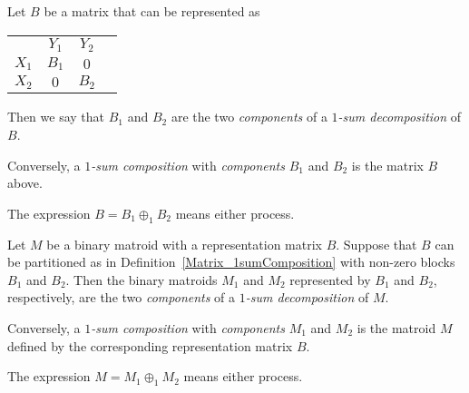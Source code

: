 \begin{definition}
  \label{Matrix_1sumComposition}
  \leanok
  Let $B$ be a matrix that can be represented as
  \begin{tabular}{cccc}
                                 & $Y_{1}$                      & $Y_{2}$                      \\ \cline{2-3}
    \multicolumn{1}{c|}{$X_{1}$} & \multicolumn{1}{c|}{$B_{1}$} & \multicolumn{1}{c|}{    $0$} \\ \cline{2-3}
    \multicolumn{1}{c|}{$X_{2}$} & \multicolumn{1}{c|}{    $0$} & \multicolumn{1}{c|}{$B_{2}$} \\ \cline{2-3}
  \end{tabular}
  Then we say that $B_{1}$ and $B_{2}$ are the two \emph{components} of a \emph{$1$-sum decomposition} of $B$.

  Conversely, a \emph{$1$-sum composition} with \emph{components} $B_{1}$ and $B_{2}$ is the matrix $B$ above.

  The expression $B = B_{1} \oplus_{1} B_{2}$ means either process.
\end{definition}

\begin{definition}
  \label{BinaryMatroid.Is1sumOf}
  \leanok
  Let $M$ be a binary matroid with a representation matrix $B$.
  Suppose that $B$ can be partitioned as in Definition~\ref{Matrix_1sumComposition} with non-zero blocks $B_{1}$ and $B_{2}$.
  Then the binary matroids $M_{1}$ and $M_{2}$ represented by $B_{1}$ and $B_{2}$, respectively, are the two \emph{components} of a \emph{$1$-sum decomposition} of $M$.

  Conversely, a \emph{$1$-sum composition} with \emph{components} $M_{1}$ and $M_{2}$ is the matroid $M$ defined by the corresponding representation matrix $B$.

  The expression $M = M_{1} \oplus_{1} M_{2}$ means either process.
\end{definition}


\begin{lemma}
  \label{BinaryMatroid_1sum_comm}
  \leanok
\end{lemma}

